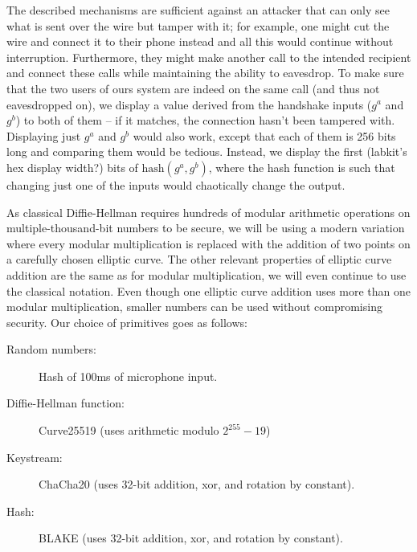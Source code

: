 \documentclass[a4paper]{article}
\begin{document}
The described mechanisms are sufficient against an attacker that can only see
what is sent over the wire but tamper with it; for example, one might cut the
wire and connect it to their phone instead and all this would continue without
interruption. Furthermore, they might make another call to the intended
recipient and connect these calls while maintaining the ability to eavesdrop. To
make sure that the two users of ours system are indeed on the same call (and
thus not eavesdropped on), we display a value derived from the handshake inputs
($g^a$ and $g^b$) to both of them -- if it matches, the connection hasn't been
tampered with. Displaying just $g^a$ and $g^b$ would also work, except that each
of them is 256 bits long and comparing them would be tedious. Instead, we
display the first (labkit's hex display width?) bits of $\text{hash}(g^a, g^b)$,
where the hash function is such that changing just one of the inputs would
chaotically change the output.

As classical Diffie-Hellman requires hundreds of modular arithmetic operations
on multiple-thousand-bit numbers to be secure, we will be using a modern
variation where every modular multiplication is replaced with the addition of
two points on a carefully chosen elliptic curve. The other relevant properties
of elliptic curve addition are the same as for modular multiplication, we will
even continue to use the classical notation. Even though one elliptic curve
addition uses more than one modular multiplication, smaller numbers can be used
without compromising security. Our choice of primitives goes as follows:

\begin{description}
  \item[Random numbers:] Hash of 100ms of microphone input.
  \item[Diffie-Hellman function:] Curve25519 (uses arithmetic modulo $2^{255}-19$)
  \item[Keystream:] ChaCha20 (uses 32-bit addition, xor, and rotation by constant).
  \item[Hash:] BLAKE (uses 32-bit addition, xor, and rotation by constant).
\end{description}
\end{document}
